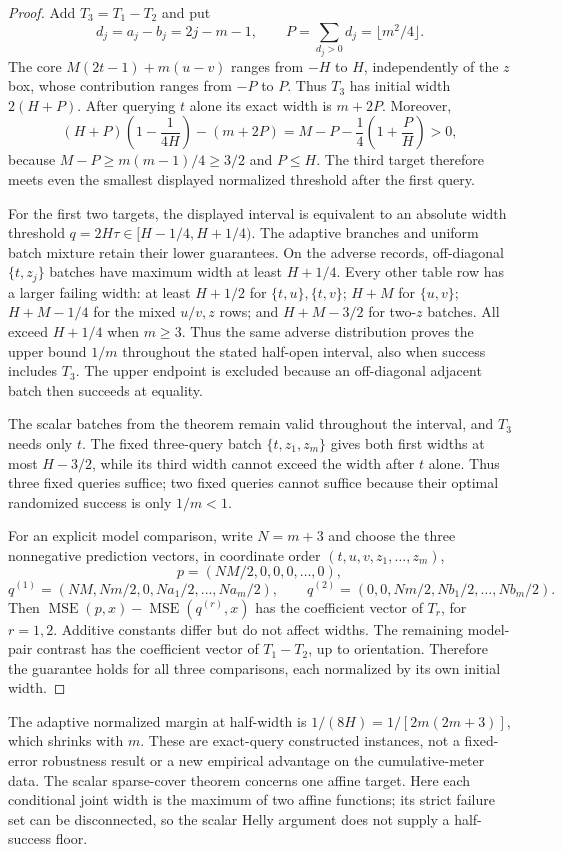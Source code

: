 \documentclass[12pt]{article}
\begin{document}
\begin{proof}
Add $T_3=T_1-T_2$ and put
\[
 d_j=a_j-b_j=2j-m-1,\qquad
 P=\sum_{d_j>0}d_j=\lfloor m^2/4\rfloor.
\]
The core $M(2t-1)+m(u-v)$ ranges from $-H$ to $H$, independently of
the $z$ box, whose contribution ranges from $-P$ to $P$. Thus $T_3$ has
initial width $2(H+P)$. After querying $t$ alone its exact width is
$m+2P$. Moreover,
\[
 (H+P)\left(1-\frac1{4H}\right)-(m+2P)
 =M-P-\frac14\left(1+\frac PH\right)>0,
\]
because $M-P\geq m(m-1)/4\geq3/2$ and $P\leq H$.
The third target therefore meets even the smallest displayed normalized
threshold after the first query.

For the first two targets, the displayed interval is equivalent to an
absolute width threshold $q=2H\tau\in[H-1/4,H+1/4)$. The adaptive
branches and uniform batch mixture retain their lower guarantees.
On the adverse records, off-diagonal $\{t,z_j\}$ batches have maximum
width at least $H+1/4$. Every other table row has a larger failing width:
at least $H+1/2$ for $\{t,u\},\{t,v\}$;
$H+M$ for $\{u,v\}$; $H+M-1/4$ for the mixed $u/v,z$ rows;
and $H+M-3/2$ for two-$z$ batches. All exceed $H+1/4$ when $m\geq3$.
Thus the same adverse distribution proves the upper bound $1/m$
throughout the stated half-open interval, also when success includes $T_3$.
The upper endpoint is excluded because an off-diagonal adjacent batch
then succeeds at equality.

The scalar batches from the theorem remain valid throughout the interval,
and $T_3$ needs only $t$. The fixed three-query batch $\{t,z_1,z_m\}$
gives both first widths at most $H-3/2$, while its third width cannot
exceed the width after $t$ alone. Thus three fixed queries suffice;
two fixed queries cannot suffice because their optimal randomized success
is only $1/m<1$.

For an explicit model comparison, write $N=m+3$ and choose the three
nonnegative prediction vectors, in coordinate order $(t,u,v,z_1,\ldots,z_m)$,
\[
 p=(NM/2,0,0,0,\ldots,0),
\]
\[
 q^{(1)}=(NM,Nm/2,0,Na_1/2,\ldots,Na_m/2),\qquad
 q^{(2)}=(0,0,Nm/2,Nb_1/2,\ldots,Nb_m/2).
\]
Then $\operatorname{MSE}(p,x)-\operatorname{MSE}(q^{(r)},x)$ has
the coefficient vector of $T_r$, for $r=1,2$. Additive constants differ
but do not affect widths. The remaining model-pair contrast has the
coefficient vector of $T_1-T_2$, up to orientation. Therefore the guarantee
holds for all three comparisons, each normalized by its own initial width.
\end{proof}

The adaptive normalized margin at half-width is
$1/(8H)=1/[2m(2m+3)]$, which shrinks with $m$. These are exact-query
constructed instances, not a fixed-error robustness result or a new
empirical advantage on the cumulative-meter data. The scalar sparse-cover
theorem concerns one affine target. Here each conditional joint width is
the maximum of two affine functions; its strict failure set can be
disconnected, so the scalar Helly argument does not supply a half-success
floor.
\end{document}
